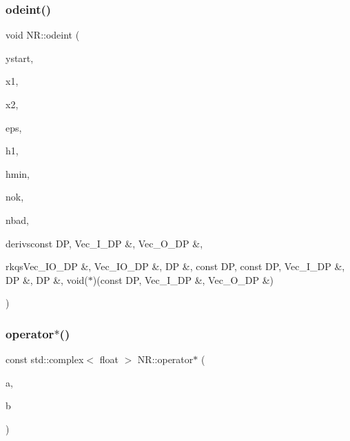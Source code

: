 \subsubsection{\texorpdfstring{odeint()}{odeint()}}
{\footnotesize\ttfamily void N\+R\+::odeint (\begin{DoxyParamCaption}\item[{\mbox{\hyperlink{namespaceNR_ab293e06a6bf799d8a7ed932b6852bcb8}{Vec\+\_\+\+I\+O\+\_\+\+DP}} \&}]{ystart,  }\item[{const \mbox{\hyperlink{namespaceNR_af6ff762dd605ff477b8e52387253a02a}{DP}}}]{x1,  }\item[{const \mbox{\hyperlink{namespaceNR_af6ff762dd605ff477b8e52387253a02a}{DP}}}]{x2,  }\item[{const \mbox{\hyperlink{namespaceNR_af6ff762dd605ff477b8e52387253a02a}{DP}}}]{eps,  }\item[{const \mbox{\hyperlink{namespaceNR_af6ff762dd605ff477b8e52387253a02a}{DP}}}]{h1,  }\item[{const \mbox{\hyperlink{namespaceNR_af6ff762dd605ff477b8e52387253a02a}{DP}}}]{hmin,  }\item[{int \&}]{nok,  }\item[{int \&}]{nbad,  }\item[{void }]{derivsconst D\+P, Vec\+\_\+\+I\+\_\+\+D\+P \&, Vec\+\_\+\+O\+\_\+\+D\+P \&,  }\item[{void }]{rkqsVec\+\_\+\+I\+O\+\_\+\+D\+P \&, Vec\+\_\+\+I\+O\+\_\+\+D\+P \&, D\+P \&, const D\+P, const D\+P, Vec\+\_\+\+I\+\_\+\+D\+P \&, D\+P \&, D\+P \&, void($\ast$)(const D\+P, Vec\+\_\+\+I\+\_\+\+D\+P \&, Vec\+\_\+\+O\+\_\+\+D\+P \&) }\end{DoxyParamCaption})}

\mbox{\label{namespaceNR_abe1bfc853e642c91a1084cd7cc55da26}} 
\subsubsection{\texorpdfstring{operator$\ast$()}{operator*()}\hspace{0.1cm}{\footnotesize\ttfamily [1/2]}}
{\footnotesize\ttfamily const std\+::complex$<$ float $>$ N\+R\+::operator$\ast$ (\begin{DoxyParamCaption}\item[{const double \&}]{a,  }\item[{const std\+::complex$<$ float $>$ \&}]{b }\end{DoxyParamCaption})\hspace{0.3cm}{\ttfamily [inline]}}

